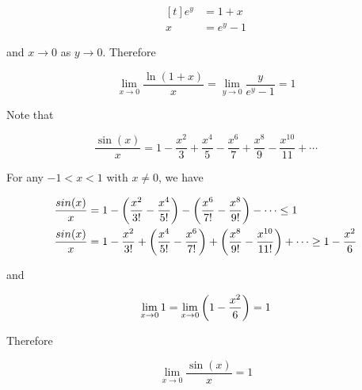 \documentclass[a4paper,12pt]{article}
\begin{document}
\begin{pst}
  $$\begin{aligned}[t]
    e^{y}&=1+x\\
    x&=e^{y}-1
  \end{aligned}$$\s

  and $x\to 0$ as $y\to 0$. Therefore

  $$\lim_{x\to 0}\frac{\ln(1+x)}{x}=\lim_{y\to 0}\frac{y}{e^{y}-1}=1$$\s

   Note that

  $$\frac{\sin(x)}{x}=1-\frac{x^{2}}{3}+\frac{x^{4}}{5}-\frac{x^{6}}{7}+\frac{x^{8}}{9}-\frac{x^{10}}{11}+\cdots$$\s

  For any $-1<x<1$ with $x\neq 0$, we have

  $$\begin{aligned}[t]
    \frac{sin(x)}{x}&=1-\left( \frac{x^{2}}{3!}-\frac{x^{4}}{5!}\right)-\left( \frac{x^{6}}{7!}-\frac{x^{8}}{9!}\right)-\cdots \leq 1\\
    \frac{sin(x)}{x}&=1-\frac{x^{2}}{3!}+\left( \frac{x^{4}}{5!}-\frac{x^{6}}{7!}\right)+\left( \frac{x^{8}}{9!}-\frac{x^{10}}{11!}\right)+\cdots \geq 1-\frac{x^{2}}{6}
  \end{aligned}$$\s

  and

  $$\lim_{x\to 0}1=\lim_{x\to 0}\left( 1-\frac{x^{2}}{6}\right)=1$$

  Therefore

  $$\lim_{x\to 0}\frac{\sin(x)}{x}=1$$
\end{pst}
\end{document}
